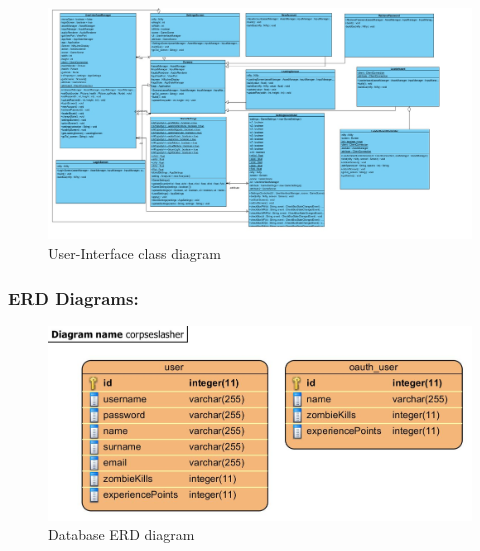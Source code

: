 \documentclass[letterpaper]{article}
\begin{document}
					\begin{figure}[H]
					\centering
					\includegraphics[width=180mm]{UML_Diagram/Class/GUI_Classes.jpg}
					\caption{User-Interface class diagram}
					\label{overflow}
					\end{figure}
					
				\vspace{0.2in}	
				\subsubsection*{ERD Diagrams:}
				\vspace{0.1in}
				
					\begin{figure}[H]
					\centering
					\includegraphics[width=180mm]{UML_Diagram/ERD/Database.jpg}
					\caption{Database ERD diagram}
					\label{overflow}
					\end{figure}
					
					
		\vspace{0.2in}
		
		\section*{\colorbox{blue}{}} 
		\vspace{0.1in}
		
\end{document}
